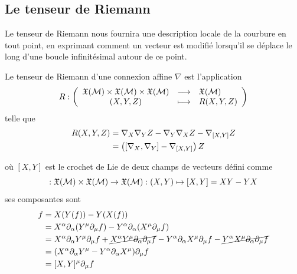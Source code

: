\subsection{Le tenseur de Riemann}
Le tenseur de Riemann nous fournira une description locale de la courbure en tout point, en exprimant comment un vecteur est modifié lorsqu'il se déplace le long d'une boucle infinitésimal autour de ce point. 

\begin{theoremframe}
    \begin{defi}
        Le tenseur de Riemann d'une connexion affine $\nabla$ est l'application 
        \begin{align}
            R : \left( \begin{array}{ccl}
                \mathfrak{X} (\mathcal{M}) \times \mathfrak{X} (\mathcal{M}) \times \mathfrak{X} (\mathcal{M}) & \longrightarrow & \mathfrak{X}(\mathcal{M}) \\
                (X,Y,Z) & \longmapsto & R(X,Y,Z)
            \end{array}
            \right)
        \end{align}
        telle que
        \begin{align}
            R(X,Y,Z) &=\nabla_{X}\nabla_{Y}Z - \nabla_{Y}\nabla_{X}Z - \nabla_{[X, Y]}Z\\
            \nonumber
            &= \left( [\nabla_X,\nabla_Y] - \nabla_{[X,Y]} \right) Z
        \end{align}
    \end{defi}
\end{theoremframe}
où $[X, Y]$ est le crochet de Lie de deux champs de vecteurs défini comme
\begin{equation}
     [\, \cdot \,,\, \cdot \,]:\Zhe(\mathcal{M})\times \Zhe(\mathcal{M}) \rightarrow \Zhe(\mathcal{M}) : (X, Y) \mapsto [X, Y]= XY -YX
\end{equation}
ses composantes sont
\begin{align*}
    [X, Y]f &= X(Y(f)) - Y(X(f))\\
    &= X^{\alpha}\partial_{\alpha}(Y^{\mu}\partial_{\mu}f) - Y^{\alpha}\partial_{\alpha}(X^{\mu}\partial_{\mu}f)\\
    &= X^{\alpha}\partial_{\alpha}Y^{\mu}\partial_{\mu}f + \cancel{X^{\alpha}Y^{\mu}\partial_{\alpha}\partial_{\mu}f} - Y^{\alpha}\partial_{\alpha}X^{\mu}\partial_{\mu}f - \cancel{Y^{\alpha}X^{\mu}\partial_{\alpha}\partial_{\mu}f}\\
    &= (X^{\alpha}\partial_{\alpha}Y^{\mu} - Y^{\alpha}\partial_{\alpha}X^{\mu} )\partial_{\mu}f\\
    &= [X, Y]^{\mu}\partial_{\mu}f
\end{align*}
